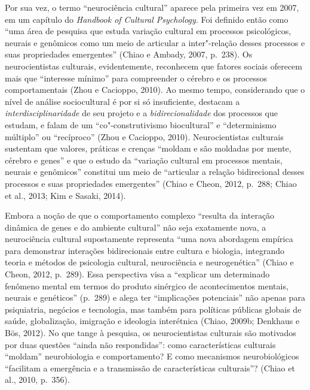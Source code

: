 Por sua vez, o termo ``neurociência cultural'' aparece pela
primeira vez em 2007, em um capítulo do \emph{Handbook of Cultural
Psychology}. Foi definido então como ``uma área de pesquisa que estuda
variação cultural em processos psicológicos, neurais e genômicos como um
meio de articular a inter"-relação desses processos e suas propriedades
emergentes'' (Chiao e Ambady, 2007, p.~238). Os neurocientistas culturais,
evidentemente, reconhecem que fatores sociais oferecem mais que
``interesse mínimo'' para compreender o cérebro e os processos
comportamentais (Zhou e Cacioppo, 2010). Ao mesmo tempo, considerando
que o nível de análise sociocultural é por si só insuficiente, destacam
a \emph{interdisciplinaridade} de seu projeto e a
\emph{bidirecionalidade} dos processos que estudam, e falam de um
``co"-construtivismo biocultural'' e ``determinismo múltiplo'' ou
``recíproco'' (Zhou e Cacioppo, 2010). Neurocientistas culturais
sustentam que valores, práticas e crenças ``moldam e são moldadas por
mente, cérebro e genes'' e que o estudo da ``variação cultural em
processos mentais, neurais e genômicos'' constitui um meio de
``articular a relação bidirecional desses processos e suas propriedades
emergentes'' (Chiao e Cheon, 2012, p.~288; Chiao et al., 2013; Kim e
Sasaki, 2014).

Embora a noção de que o comportamento complexo ``resulta da interação
dinâmica de genes e do ambiente cultural'' não seja exatamente nova, a
neurociência cultural supostamente representa ``uma nova abordagem
empírica para demonstrar interações bidirecionais entre cultura e
biologia, integrando teoria e métodos de psicologia cultural,
neurociência e neurogenética'' (Chiao e Cheon, 2012, p.~289). Essa
perspectiva visa a ``explicar um determinado fenômeno mental em termos do
produto sinérgico de acontecimentos mentais, neurais e genéticos''
(p.~289) e alega ter ``implicações potenciais'' não apenas para
psiquiatria, negócios e tecnologia, mas também para políticas públicas
globais de saúde, globalização, imigração e ideologia interétnica
(Chiao, 2009b; Denkhaus e Bös, 2012). No que tange à pesquisa, os
neurocientistas culturais são motivados por duas questões ``ainda não
respondidas'': como características culturais ``moldam'' neurobiologia e
comportamento? E como mecanismos neurobiológicos ``facilitam a
emergência e a transmissão de características culturais''? (Chiao et
al., 2010, p.~356).

